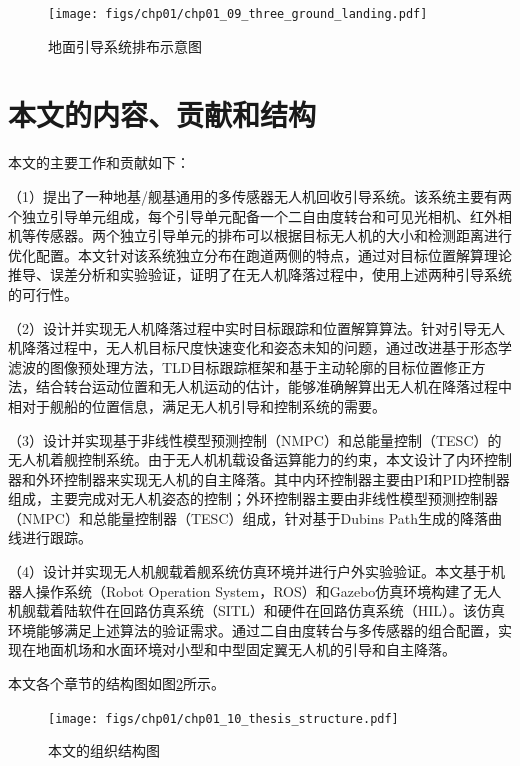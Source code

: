 \begin{figure}[htb]   
	\centering
	\texttt{[image: figs/chp01/chp01\_09\_three\_ground\_landing.pdf]}
	\caption{地面引导系统排布示意图\cite{Martinez2010}}
	\label{fig:chp01_09_three_ground_landing}
\end{figure}

\section{本文的内容、贡献和结构}
本文的主要工作和贡献如下：

（1）提出了一种地基/舰基通用的多传感器无人机回收引导系统。该系统主要有两个独立引导单元组成，每个引导单元配备一个二自由度转台和可见光相机、红外相机等传感器。两个独立引导单元的排布可以根据目标无人机的大小和检测距离进行优化配置。本文针对该系统独立分布在跑道两侧的特点，通过对目标位置解算理论推导、误差分析和实验验证，证明了在无人机降落过程中，使用上述两种引导系统的可行性。

（2）设计并实现无人机降落过程中实时目标跟踪和位置解算算法。针对引导无人机降落过程中，无人机目标尺度快速变化和姿态未知的问题，通过改进基于形态学滤波的图像预处理方法，TLD目标跟踪框架和基于主动轮廓的目标位置修正方法，结合转台运动位置和无人机运动的估计，能够准确解算出无人机在降落过程中相对于舰船的位置信息，满足无人机引导和控制系统的需要。

（3）设计并实现基于非线性模型预测控制（NMPC）和总能量控制（TESC）的无人机着舰控制系统。由于无人机机载设备运算能力的约束，本文设计了内环控制器和外环控制器来实现无人机的自主降落。其中内环控制器主要由PI和PID控制器组成，主要完成对无人机姿态的控制；外环控制器主要由非线性模型预测控制器（NMPC）和总能量控制器（TESC）组成，针对基于Dubins Path生成的降落曲线进行跟踪。

（4）设计并实现无人机舰载着舰系统仿真环境并进行户外实验验证。本文基于机器人操作系统（Robot Operation System，ROS）和Gazebo仿真环境构建了无人机舰载着陆软件在回路仿真系统（SITL）和硬件在回路仿真系统（HIL）。该仿真环境能够满足上述算法的验证需求。通过二自由度转台与多传感器的组合配置，实现在地面机场和水面环境对小型和中型固定翼无人机的引导和自主降落。

本文各个章节的结构图如图\ref{fig:chp01_10_thesis_structure}所示。
\begin{figure}[!h]   
	\centering	
	\texttt{[image: figs/chp01/chp01\_10\_thesis\_structure.pdf]}
	\caption{本文的组织结构图}
	\label{fig:chp01_10_thesis_structure}
\end{figure}
